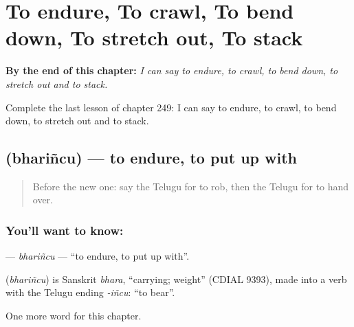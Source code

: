 
\chapter{To endure, To crawl, To bend down, To stretch out, To stack}
\label{ch:te-to-endure-to-crawl-to-bend-down-to-stretch-out-to-stack}

\begin{chapteropening}
\textbf{By the end of this chapter:} \emph{I can say to endure, to crawl, to bend down, to stretch out and to stack.}

Complete the last lesson of chapter 249: I can say to endure, to crawl, to bend down, to stretch out and to stack.
\end{chapteropening}

\section[\texorpdfstring{\te{భరించు} (bhariñcu)}{భరించు (bhariñcu)}]{ (bhariñcu) — to endure, to put up with}

\label{lesson:TE-C249-bharincu}



\begin{quote}
Before the new one: say the Telugu for to rob, then the Telugu for to hand over.
\end{quote}

\subsection*{You'll want to know: }
\textbf{} — \emph{bhariñcu} — \textquotedblleft{}to endure, to put up with\textquotedblright{}.

\begin{cousinweb}
\textbf{} (\emph{bhariñcu}) is Sanskrit \emph{bhara}, \textquotedblleft{}carrying; weight\textquotedblright{} (CDIAL 9393), made into a verb with the Telugu ending \emph{-iñcu}: \textquotedblleft{}to bear\textquotedblright{}.
\end{cousinweb}

\begin{grammarlens}[title={What you've built}]
One more word for this chapter.
\end{grammarlens}

